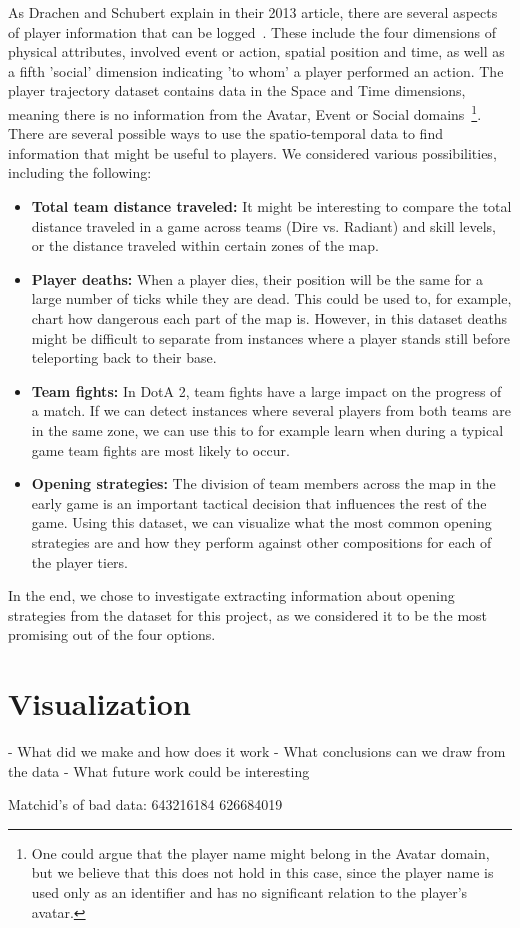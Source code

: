 \documentclass[a4paper,11pt]{article}
\begin{document}
As Drachen and Schubert explain in their 2013 article, there are several aspects of player information that can be logged~\cite{drachen2013spatial}. These include the four dimensions of physical attributes, involved event or action, spatial position and time, as well as a fifth 'social' dimension indicating 'to whom' a player performed an action.
The player trajectory dataset contains data in the Space and Time dimensions, meaning there is no information from the Avatar, Event or Social domains~\footnote{One could argue that the player name might belong in the Avatar domain, but we believe that this does not hold in this case, since the player name is used only as an identifier and has no significant relation to the player's avatar.}. There are several possible ways to use the spatio-temporal data to find information that might be useful to players. We considered various possibilities, including the following:

\begin{itemize}
\item \textbf{Total team distance traveled:} It might be interesting to compare the total distance traveled in a game across teams (Dire vs. Radiant) and skill levels, or the distance traveled within certain zones of the map.
\item \textbf{Player deaths:} When a player dies, their position will be the same for a large number of ticks while they are dead. This could be used to, for example, chart how dangerous each part of the map is. However, in this dataset deaths might be difficult to separate from instances where a player stands still before teleporting back to their base.
\item \textbf{Team fights:} In DotA 2, team fights have a large impact on the progress of a match. If we can detect instances where several players from both teams are in the same zone, we can use this to for example learn when during a typical game team fights are most likely to occur.
\item \textbf{Opening strategies:} The division of team members across the map in the early game is an important tactical decision that influences the rest of the game. Using this dataset, we can visualize what the most common opening strategies are and how they perform against other compositions for each of the player tiers.
\end{itemize}
In the end, we chose to investigate extracting information about opening strategies from the dataset for this project, as we considered it to be the most promising out of the four options.

\section{Visualization}
- What did we make and how does it work
- What conclusions can we draw from the data
- What future work could be interesting


Matchid's of bad data:
643216184
626684019



  
\end{document}
